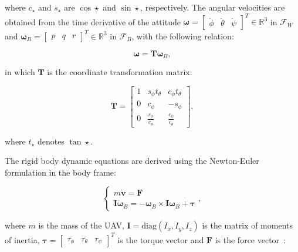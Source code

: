 where $c_{\star}$ and $s_{\star}$ are $\cos\star$ and $\sin\star$,
respectively. The angular velocities are obtained from the time derivative
of the attitude $\boldsymbol{\omega} = \begin{bmatrix}\dot{\phi} &
\dot{\theta} & \dot{\psi}\end{bmatrix}^T \in \mathbb{R}^3$ in
$\mathcal{F}_W$ and $\boldsymbol{\omega}_B = \begin{bmatrix} p & q & r
\end{bmatrix}^{T} \in \mathbb{R}^3$ in $\mathcal{F}_B$, with the
following relation:

\begin{equation}
  \boldsymbol{\omega} = \mathbf{T} \boldsymbol{\omega}_B,
  \label{eq:angular_velocity_transformation}
\end{equation}

in which $\mathbf{T}$ is the coordinate transformation matrix:

\begin{equation}
  \mathbf{T} = \begin{bmatrix} 1 & s_{\phi} t_{\theta} & c_{\phi} t_{\theta} \\ 0
  & c_{\phi} & -s_{\phi} \\ 0 & \frac{s_{\phi}}{c_{\theta}} &
  \frac{c_{\phi}}{c_{\theta}} \end{bmatrix},
\end{equation}

where $t_{\star}$ denotes $\tan\star$.

The rigid body dynamic equations are derived using the Newton-Euler formulation in the body
frame:

\begin{equation}
  \begin{cases}
    m \dot{\mathbf{v}} = \mathbf{F} \\
    \mathbf{I} \dot{\boldsymbol{\omega}}_B = -\boldsymbol{\omega}_B \times
    \mathbf{I} \boldsymbol{\omega}_B + \boldsymbol{\tau}
  \end{cases},
  \label{eq:dynamic_equations}
\end{equation}

where $m$ is the mass of the UAV, $\mathbf{I} = \mathrm{diag}(I_x, I_y, I_z)$ is
the matrix of moments of inertia, $\boldsymbol{\tau} = \begin{bmatrix}
\tau_{\phi} & \tau_{\theta} & \tau_{\psi} \end{bmatrix}^T$ is the torque vector and
$\mathbf{F}$ is the force vector~\cite{Mellinger2011ICRA}:


